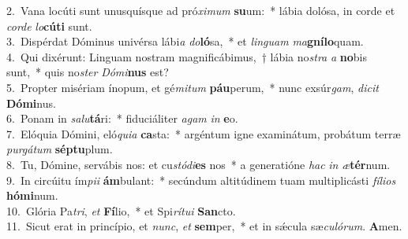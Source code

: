 {2.~}Vana locúti sunt unusquísque ad pró\textit{xi}\textit{mum} \textbf{su}um:~* lábia dolósa, in corde et \textit{cor}\textit{de} \textit{lo}\textbf{cú}\textbf{ti} sunt.\\
{3.~}Dispérdat Dóminus univérsa lábi\textit{a} \textit{do}\textbf{ló}sa,~* et \textit{lin}\textit{guam} \textit{ma}\textbf{gní}\textbf{lo}quam.\\
{4.~}Qui dixérunt: Linguam nostram magnificábimus,~† lábia no\textit{stra} \textit{a} \textbf{no}bis sunt,~* quis no\textit{ster} \textit{Dó}\textit{mi}\textbf{nus} est?\\
{5.~}Propter misériam ínopum, et gé\textit{mi}\textit{tum} \textbf{páu}perum,~* nunc exsúr\textit{gam}, \textit{di}\textit{cit} \textbf{Dó}\textbf{mi}nus.\\
{6.~}Ponam in \textit{sa}\textit{lu}\textbf{tá}ri:~* fiduciáliter \textit{a}\textit{gam} \textit{in} \textbf{e}o.\\
{7.~}Elóquia Dómini, eló\textit{qui}\textit{a} \textbf{ca}sta:~* argéntum igne examinátum, probátum terræ \textit{pur}\textit{gá}\textit{tum} \textbf{sép}\textbf{tu}plum.\\
{8.~}Tu, Dómine, servábis nos: et cu\textit{stó}\textit{di}\textbf{es} nos~* a generatióne \textit{hac} \textit{in} \textit{æ}\textbf{tér}num.\\
{9.~}In circúitu ím\textit{pi}\textit{i} \textbf{ám}bulant:~* secúndum altitúdinem tuam multiplicásti \textit{fí}\textit{li}\textit{os} \textbf{hó}\textbf{mi}num.\\
{10.~}Glória Pa\textit{tri}, \textit{et} \textbf{Fí}lio,~* et Spi\textit{rí}\textit{tu}\textit{i} \textbf{San}cto.\\
{11.~}Sicut erat in princípio, et \textit{nunc}, \textit{et} \textbf{sem}per,~* et in sǽcula sæ\textit{cu}\textit{ló}\textit{rum}. \textbf{A}men.\\
